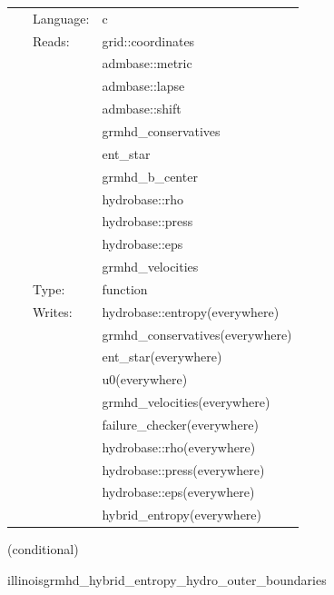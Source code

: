 \documentclass{article}
\begin{document}
 \begin{tabular*}{160mm}{cll} 
~ & Language:  & c \\ 
~ & Reads:  & grid::coordinates \\ 
~& ~ &admbase::metric\\ 
~& ~ &admbase::lapse\\ 
~& ~ &admbase::shift\\ 
~& ~ &grmhd\_conservatives\\ 
~& ~ &ent\_star\\ 
~& ~ &grmhd\_b\_center\\ 
~& ~ &hydrobase::rho\\ 
~& ~ &hydrobase::press\\ 
~& ~ &hydrobase::eps\\ 
~& ~ &grmhd\_velocities\\ 
~ & Type:  & function \\ 
~ & Writes:  & hydrobase::entropy(everywhere) \\ 
~& ~ &grmhd\_conservatives(everywhere)\\ 
~& ~ &ent\_star(everywhere)\\ 
~& ~ &u0(everywhere)\\ 
~& ~ &grmhd\_velocities(everywhere)\\ 
~& ~ &failure\_checker(everywhere)\\ 
~& ~ &hydrobase::rho(everywhere)\\ 
~& ~ &hydrobase::press(everywhere)\\ 
~& ~ &hydrobase::eps(everywhere)\\ 
~& ~ &hybrid\_entropy(everywhere)\\ 
\end{tabular*} 


\vspace{5mm}

   (conditional) 

\hspace{5mm} illinoisgrmhd\_hybrid\_entropy\_hydro\_outer\_boundaries 

\hspace{5mm}{\it entropy+hybrid version of illinoisgrmhd\_hydro\_outer\_boundaries } 


\hspace{5mm}
\end{document}
